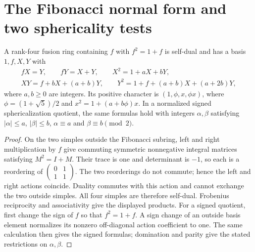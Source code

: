 \section{The Fibonacci normal form and two sphericality tests}\label{sec:fib}
\begin{lemma}\label{fib:lem:normal-form}
A rank-four fusion ring containing $f$ with $f^2=1+f$ is self-dual
and has a basis $1,f,X,Y$ with
\begin{equation}\label{fib:eq:fib-auto-rules}
\begin{gathered}
 fX=Y,\qquad fY=X+Y,\qquad X^2=1+aX+bY,\\
 XY=f+bX+(a+b)Y,\qquad
 Y^2=1+f+(a+b)X+(a+2b)Y,
\end{gathered}
\end{equation}
where $a,b\ge0$ are integers. Its positive character is
$(1,\phi,x,\phi x)$, where $\phi=(1+\sqrt5)/2$ and
$x^2=1+(a+b\phi)x$. In a normalized signed sphericalization quotient,
the same formulas hold with integers $\alpha,\beta$ satisfying
$|\alpha|\le a$, $|\beta|\le b$, $\alpha\equiv a$ and
$\beta\equiv b\pmod2$.
\end{lemma}
\begin{proof}
On the two simples outside the Fibonacci subring, left and right
multiplication by $f$ give commuting symmetric nonnegative integral
matrices satisfying $M^2=I+M$. Their trace is one and determinant is
$-1$, so each is a reordering of
$\left(\begin{smallmatrix}0&1\\1&1\end{smallmatrix}\right)$.
The two reorderings do not commute; hence the left and right actions
coincide. Duality commutes with this action and cannot exchange the
two outside simples. All four simples are therefore self-dual.
Frobenius reciprocity and associativity give the displayed products.
For a signed quotient, first change the sign of $f$ so that
$f^2=1+f$. A sign change of an outside basis element normalizes its
nonzero off-diagonal action coefficient to one. The same calculation
then gives the signed formulas; domination and parity give the stated
restrictions on $\alpha,\beta$.
\end{proof}

